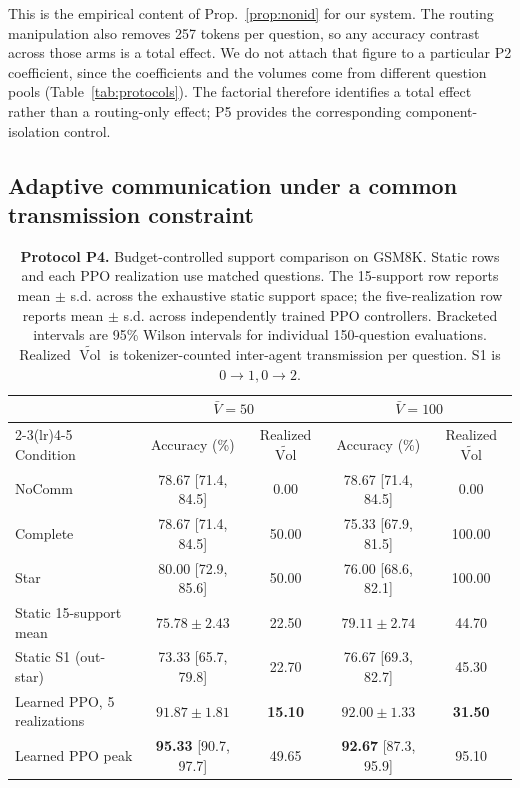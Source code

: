 \documentclass[11pt]{article}
\newcommand{\Vol}{\operatorname{Vol}}
\newcommand{\Volt}{\widetilde{\Vol}}
\begin{document}
This is the empirical content of Prop.~\ref{prop:nonid} for our system. The
routing manipulation also removes 257 tokens per question, so any accuracy
contrast across those arms is a total effect. We do not attach that figure to a
particular P2 coefficient, since the coefficients and the volumes come from
different question pools (Table~\ref{tab:protocols}). The factorial therefore
identifies a total effect rather than a routing-only effect; P5 provides the
corresponding component-isolation control.

\subsection{Adaptive communication under a common transmission constraint}
\label{sec:fixedbudget}

\begin{table}[t]
\centering
\small
\setlength{\tabcolsep}{6pt}
\begin{tabular}{lcccc}
\toprule
& \multicolumn{2}{c}{$\bar V=50$} & \multicolumn{2}{c}{$\bar V=100$} \\
\cmidrule(lr){2-3}\cmidrule(lr){4-5}
Condition & Accuracy (\%) & Realized $\Volt$ & Accuracy (\%) & Realized $\Volt$ \\
\midrule
NoComm & 78.67 {\scriptsize[71.4, 84.5]} & 0.00
       & 78.67 {\scriptsize[71.4, 84.5]} & 0.00 \\
\midrule
Complete & 78.67 {\scriptsize[71.4, 84.5]} & 50.00
         & 75.33 {\scriptsize[67.9, 81.5]} & 100.00 \\
Star & 80.00 {\scriptsize[72.9, 85.6]} & 50.00
     & 76.00 {\scriptsize[68.6, 82.1]} & 100.00 \\
Static 15-support mean & $75.78\pm2.43$ & 22.50
                       & $79.11\pm2.74$ & 44.70 \\
Static S1 (out-star) & 73.33 {\scriptsize[65.7, 79.8]} & 22.70
                     & 76.67 {\scriptsize[69.3, 82.7]} & 45.30 \\
Learned PPO, 5 realizations & $\mathbf{91.87\pm1.81}$ & \textbf{15.10}
                            & $\mathbf{92.00\pm1.33}$ & \textbf{31.50} \\
Learned PPO peak & \textbf{95.33} {\scriptsize[90.7, 97.7]} & 49.65
                 & \textbf{92.67} {\scriptsize[87.3, 95.9]} & 95.10 \\
\bottomrule
\end{tabular}
\caption{\textbf{Protocol P4.} Budget-controlled support comparison on GSM8K.
Static rows and each PPO realization use matched questions. The 15-support
row reports mean $\pm$ s.d. across the exhaustive static support space; the
five-realization row reports mean $\pm$ s.d. across independently trained PPO
controllers. Bracketed intervals are 95\% Wilson intervals for individual
150-question evaluations. Realized $\Volt$ is tokenizer-counted inter-agent
transmission per question. S1 is $0\!\to\!1,0\!\to\!2$.}
\label{tab:fixedbudget}
\end{table}
\end{document}
